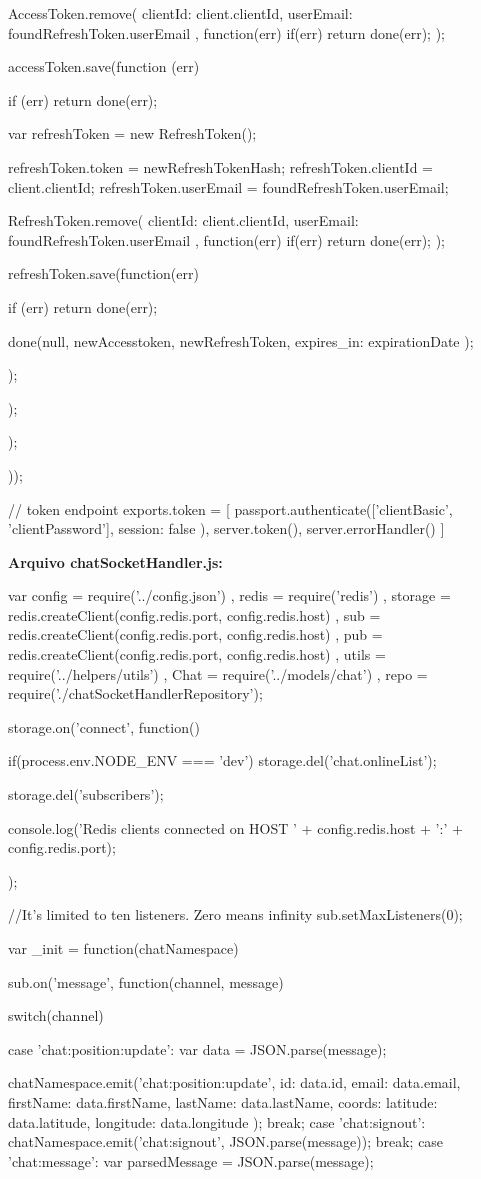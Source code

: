 \begin{flushleft}
{{		AccessToken.remove({ clientId: client.clientId, userEmail: foundRefreshToken.userEmail }, function(err) {
			if(err)
			return done(err);
		});
		
		accessToken.save(function (err) {
			if (err)
			return done(err);
			
			var refreshToken = new RefreshToken();
			
			refreshToken.token = newRefreshTokenHash;
			refreshToken.clientId = client.clientId;
			refreshToken.userEmail = foundRefreshToken.userEmail;
			
			RefreshToken.remove({ clientId: client.clientId, userEmail: foundRefreshToken.userEmail }, function(err) {
				if(err)
				return done(err);
			});
			
			refreshToken.save(function(err) {
				if (err)
				return done(err);
				
				
				done(null, newAccesstoken, newRefreshToken, { expires\_in: expirationDate });
			});
		});
	});
}));

// token endpoint
exports.token = [
passport.authenticate(['clientBasic', 'clientPassword'], { session: false }),
server.token(),
server.errorHandler()
]

\textbf{Arquivo chatSocketHandler.js:}

var config = require('../config.json')
, redis = require('redis')
, storage = redis.createClient(config.redis.port, config.redis.host)
, sub = redis.createClient(config.redis.port, config.redis.host)
, pub = redis.createClient(config.redis.port, config.redis.host)
, utils = require('../helpers/utils')
, Chat = require('../models/chat')
, repo = require('./chatSocketHandlerRepository');

storage.on('connect', function() {
	if(process.env.NODE\_ENV === 'dev') {
		storage.del('chat.onlineList');
	}
	
	storage.del('subscribers');  
	
	console.log('Redis clients connected on HOST ' + config.redis.host + ':' + config.redis.port);
});


//It's limited to ten listeners. Zero means infinity
sub.setMaxListeners(0);

var \_init = function(chatNamespace) {
	sub.on('message', function(channel, message) {
		switch(channel) {
			case 'chat:position:update':
			var data = JSON.parse(message);
			
			chatNamespace.emit('chat:position:update', {
				id: data.id,
				email: data.email,
				firstName: data.firstName,
				lastName: data.lastName,
				coords: {
					latitude: data.latitude,
					longitude: data.longitude
				}
			});
			break;
			case 'chat:signout':
			chatNamespace.emit('chat:signout', JSON.parse(message));
			break;
			case 'chat:message':
			var parsedMessage = JSON.parse(message);
			
}}}
\end{flushleft}
